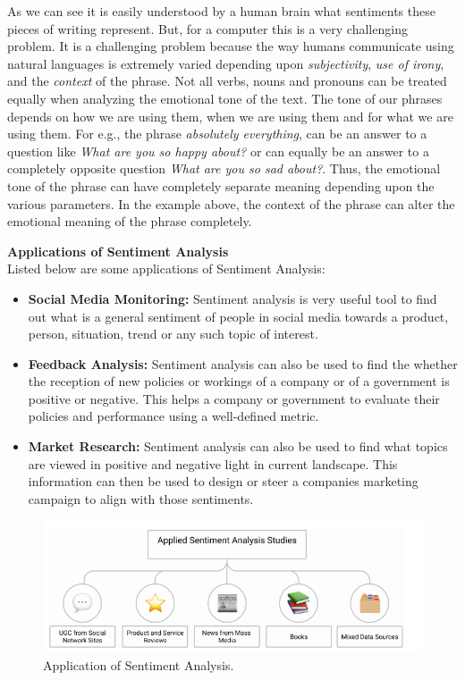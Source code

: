 \documentclass[a4paper, 12pt]{article}
\begin{document}
\begin{sloppypar}
As we can see it is easily understood by a human brain what sentiments these pieces of writing represent. But, for a computer this is a very challenging problem. It is a challenging problem because the way humans communicate using natural languages is extremely varied depending  upon \textit{subjectivity}, \textit{use of irony}, and the \textit{context} of the phrase. Not all verbs, nouns and pronouns can be treated equally when analyzing the emotional tone of the text. The tone of our phrases depends on how we are using them, when we are using them and for what we are using them. For e.g., the phrase \textit{absolutely everything}, can be an answer to a question like \textit{What are you so happy about?} or can equally be an answer to a completely opposite  question \textit{What are you so sad about?}. Thus, the emotional tone of the phrase can have completely separate meaning depending upon the various parameters. In the example above, the context of the phrase can alter the emotional meaning of the phrase completely. 

\large \textbf{Applications of Sentiment Analysis} \\[0.5ex]
\normalsize
Listed below are some applications of Sentiment Analysis:
\begin{itemize}
\item{
\textbf{Social Media Monitoring: } Sentiment analysis is very useful tool to find out what is a general sentiment of people in social media towards a product, person, situation, trend or any such topic of interest.}
\item{
\textbf{Feedback Analysis: } Sentiment analysis can also be used to find the whether the  reception of new policies or workings of a company or of a government is positive or negative. This helps a company or government to evaluate their policies and performance using a well-defined metric.}
\item{
\textbf{Market Research: } Sentiment analysis can also be used to find what topics are viewed in positive and negative light in current landscape. This information can then be used to design or steer a companies marketing campaign to align with those sentiments.}
\end{itemize}


\begin{figure}[H]
\begin{center}
\includegraphics[scale=0.7]{cat.png}
\caption{Application of Sentiment Analysis.\cite{smetanin_applications_2020} \label{cat}}
\end{center}
\end{figure}


\end{sloppypar}
\end{document}
